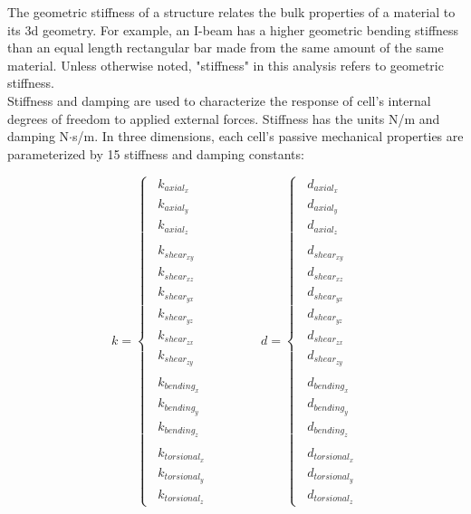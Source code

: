 {The geometric stiffness of a structure relates the bulk properties of a material to its 3d geometry.  For example, an I-beam has a higher geometric bending stiffness than an equal length rectangular bar made from the same amount of the same material.  Unless otherwise noted, "stiffness" in this analysis refers to geometric stiffness.\\

Stiffness and damping are used to characterize the response of cell's internal degrees of freedom to applied external forces.  Stiffness has the units N/m and damping N$\cdot$s/m.  In three dimensions, each cell's passive mechanical properties are parameterized by 15 stiffness and damping constants:

\[ k  = \begin{cases}
\enspace k_{axial_x}\\
\enspace k_{axial_y}\\
\enspace k_{axial_z}\\
\\
\enspace k_{shear_{xy}}\\
\enspace k_{shear_{xz}}\\
\enspace k_{shear_{yx}}\\
\enspace k_{shear_{yz}}\\
\enspace k_{shear_{zx}}\\
\enspace k_{shear_{zy}}\\
\\
\enspace k_{bending_x}\\
\enspace k_{bending_y}\\
\enspace k_{bending_z}\\
\\
\enspace k_{torsional_x}\\
\enspace k_{torsional_y}\\
\enspace k_{torsional_z}
 \end{cases}
 \qquad\qquad
 d  = \begin{cases}
\enspace d_{axial_x}\\
\enspace d_{axial_y}\\
\enspace d_{axial_z}\\
\\
\enspace d_{shear_{xy}}\\
\enspace d_{shear_{xz}}\\
\enspace d_{shear_{yx}}\\
\enspace d_{shear_{yz}}\\
\enspace d_{shear_{zx}}\\
\enspace d_{shear_{zy}}\\
\\
\enspace d_{bending_x}\\
\enspace d_{bending_y}\\
\enspace d_{bending_z}\\
\\
\enspace d_{torsional_x}\\
\enspace d_{torsional_y}\\
\enspace d_{torsional_z}
 \end{cases}  \]
\\

}

